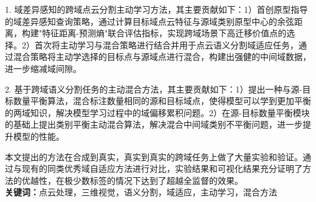 
1. 域差异感知的跨域点云分割主动学习方法，其主要贡献如下：1）首创原型指导的域差异感知查询策略，通过计算目标域点云特征与源域类别原型中心的余弦距离，构建"特征距离-预测熵"联合评估指标，实现跨域场景下高迁移价值点的选择。2）首次将主动学习与混合策略进行结合并用于点云语义分割域适应任务，通过混合策略将主动学选择的目标点与源域点进行混合，构建出强健的中间域数据，进一步缩减域间隙。

2. 基于跨域语义分割任务的主动混合方法，其主要贡献如下：1）提出一种与源-目标数量平衡算法，混合标注数量相同的源和目标域点，使得模型可以学到更加平衡的两域知识，解决模型学习过程中的域偏移累积问题。2）在源-目标数量平衡模块的基础上提出类别平衡主动混合算法，解决混合中间域类别不平衡问题，进一步提升模型的性能。

本文提出的方法在合成到真实，真实到真实的跨域任务上做了大量实验和验证。通过与现有的同类优秀域自适应方法进行对比，实验结果和可视化结果充分证明了方法的优越性，在极少数标签的情况下达到了超越全监督的效果。\\

\noindent\songti\textbf{关键词：}点云处理，三维视觉，语义分割，域适应，主动学习，混合方法

\clearpage